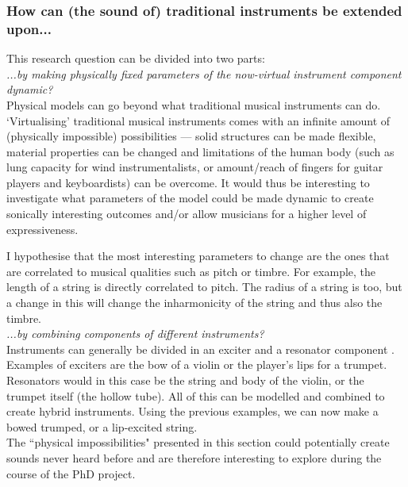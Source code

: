 \subsubsection*{How can (the sound of) traditional instruments be extended upon...}
This research question can be divided into two parts: 
\\

\noindent\textit{...by making physically fixed parameters of the now-virtual instrument component dynamic? }
\vspace{0.15cm}
\\
\noindent Physical models can go beyond what traditional musical instruments can do. ‘Virtualising’ traditional musical instruments comes with an infinite amount of (physically impossible) possibilities — solid structures can be made flexible, material properties can be changed and limitations of the human body (such as lung capacity for wind instrumentalists, or amount/reach of fingers for guitar players and keyboardists) can be overcome. It would thus be interesting to investigate what parameters of the model could be made dynamic to create sonically interesting outcomes and/or allow musicians for a higher level of expressiveness.

I hypothesise that the most interesting parameters to change are the ones that are correlated to musical qualities such as pitch or timbre. For example, the length of a string is directly correlated to pitch. The radius of a string is too, but a change in this will change the inharmonicity of the string and thus also the timbre.
\\

\noindent\textit{...by combining components of different instruments?}
\vspace{0.15cm}
\\
\noindent Instruments can generally be divided in an exciter and a resonator component \cite{Borin1989}. Examples of exciters are the bow of a violin or the player's lips for a trumpet. Resonators would in this case be the string and body of the violin, or the trumpet itself (the hollow tube). All of this can be modelled and combined to create hybrid instruments. Using the previous examples, we can now make a bowed trumped, or a lip-excited string.
\\

\noindent The ``physical impossibilities" presented in this section could potentially create sounds never heard before and are therefore interesting to explore during the course of the PhD project. 

